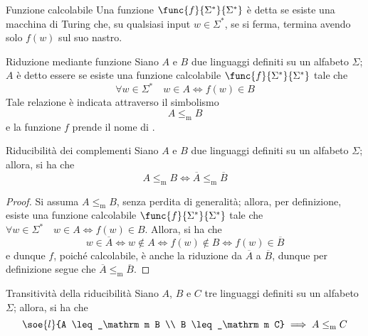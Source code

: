 \documentclass[a4paper, 12pt]{report}
\begin{document}
    \begin{frameddefn}{Funzione calcolabile}
        Una funzione $\func{f}{\Sigma^*}{\Sigma^*}$ è detta  se esiste una macchina di Turing che, su qualsiasi input $w \in \Sigma^*$, se si ferma, termina avendo solo $f(w)$ sul suo nastro.
    \end{frameddefn}

    \begin{frameddefn}{Riduzione mediante funzione}
        Siano $A$ e $B$ due linguaggi definiti su un alfabeto $\Sigma$; $A$ è detto essere  se esiste una funzione calcolabile $\func{f}{\Sigma^*}{\Sigma^*}$ tale che $$\forall w \in \Sigma^* \quad w \in A \iff f(w) \in B$$ Tale relazione è indicata attraverso il simbolismo $$A \leq_\mathrm m B$$ e la funzione $f$ prende il nome di .
    \end{frameddefn}

    \begin{framedlem}[label={red compl}]{Riducibilità dei complementi}
        Siano $A$ e $B$ due linguaggi definiti su un alfabeto $\Sigma$; allora, si ha che $$A \leq_\mathrm m B \iff \overline A \leq_\mathrm m \overline B$$
    \end{framedlem}

    \begin{proof}
        Si assuma $A \leq_\mathrm m B$, senza perdita di generalità; allora, per definizione, esiste una funzione calcolabile $\func{f}{\Sigma^*}{\Sigma^*}$ tale che $\forall w \in \Sigma ^* \quad w \in A \iff f(w) \in B$. Allora, si ha che $$w \in \overline A \iff w \notin A \iff f(w) \notin B \iff f(w) \in \overline B$$ e dunque $f$, poiché calcolabile, è anche la riduzione da $\overline A$ a $\overline B$, dunque per definizione segue che $\overline A \leq_\mathrm m \overline B$.
    \end{proof}

    \begin{framedlem}[label={red trans}]{Transitività della riducibilità}
        Siano $A$, $B$ e $C$ tre linguaggi definiti su un alfabeto $\Sigma$; allora, si ha che $$\soe{l}{A \leq_\mathrm m B \\ B \leq_\mathrm m C} \implies A \leq_\mathrm m C$$
    \end{framedlem}
\end{document}
